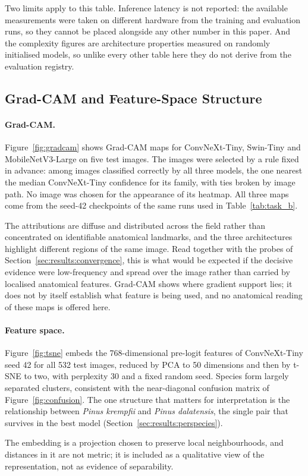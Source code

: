 Two limits apply to this table. Inference latency is not reported: the
available measurements were taken on different hardware from the training
and evaluation runs, so they cannot be placed alongside any other number in
this paper. And the complexity figures are architecture properties measured
on randomly initialised models, so unlike every other table here they do not
derive from the evaluation registry.

\subsection{Grad-CAM and Feature-Space Structure}
\label{sec:results:gradcam}

\paragraph{Grad-CAM.} Figure~\ref{fig:gradcam} shows Grad-CAM maps for
ConvNeXt-Tiny, Swin-Tiny and MobileNetV3-Large on five test images. The
images were selected by a rule fixed in advance: among images classified
correctly by all three models, the one nearest the median ConvNeXt-Tiny
confidence for its family, with ties broken by image path. No image was
chosen for the appearance of its heatmap. All three maps come from the
seed-42 checkpoints of the same runs used in
Table~\ref{tab:task_b}.

The attributions are diffuse and distributed across the field rather than
concentrated on identifiable anatomical landmarks, and the three
architectures highlight different regions of the same image. Read together
with the probes of Section~\ref{sec:results:convergence}, this is what would
be expected if the decisive evidence were low-frequency and spread over the
image rather than carried by localised anatomical features. Grad-CAM shows
where gradient support lies; it does not by itself establish what feature is
being used, and no anatomical reading of these maps is offered here.

\paragraph{Feature space.} Figure~\ref{fig:tsne} embeds the 768-dimensional
pre-logit features of ConvNeXt-Tiny seed 42 for all 532 test images, reduced
by PCA to 50 dimensions and then by t-SNE to two, with perplexity 30 and a
fixed random seed. Species form largely separated clusters, consistent with
the near-diagonal confusion matrix of Figure~\ref{fig:confusion}. The one
structure that matters for interpretation is the relationship between
\textit{Pinus krempfii} and \textit{Pinus dalatensis}, the single pair that
survives in the best model (Section~\ref{sec:results:perspecies}).

The embedding is a projection chosen to preserve local neighbourhoods, and
distances in it are not metric; it is included as a qualitative view of the
representation, not as evidence of separability.
